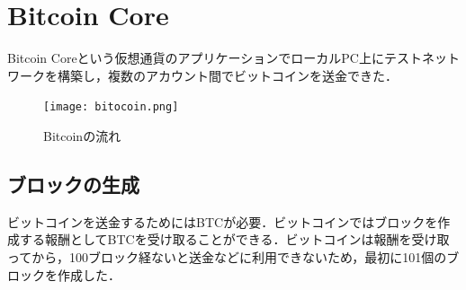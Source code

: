 \newpage


\section{Bitcoin Core}
Bitcoin Coreという仮想通貨のアプリケーションでローカルPC上にテストネットワークを構築し，複数のアカウント間でビットコインを送金できた．

\begin{figure}[h]
\centering
\texttt{[image: bitocoin.png]}
\caption{Bitcoinの流れ}\label{サンプル図}
\end{figure}
\newpage

\subsection{ブロックの生成}
ビットコインを送金するためにはBTCが必要．ビットコインではブロックを作成する報酬としてBTCを受け取ることができる．ビットコインは報酬を受け取ってから，100ブロック経ないと送金などに利用できないため，最初に101個のブロックを作成した．

